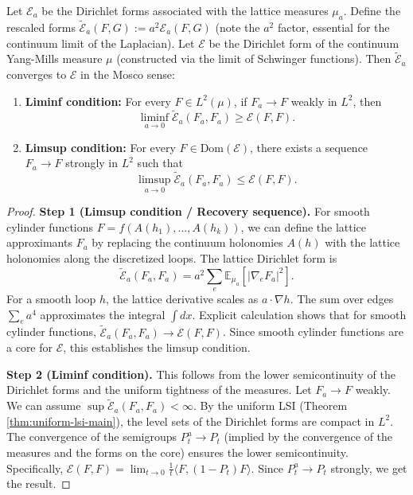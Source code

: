 \begin{theorem}
\label{thm:mosco-convergence}
Let $\mathcal E_a$ be the Dirichlet forms associated with the lattice measures $\mu_a$.
Define the rescaled forms $\tilde{\mathcal E}_a(F,G) := a^2 \mathcal E_a(F,G)$ (note the $a^2$ factor, essential for the continuum limit of the Laplacian).
Let $\mathcal E$ be the Dirichlet form of the continuum Yang-Mills measure $\mu$ (constructed via the limit of Schwinger functions).
Then $\tilde{\mathcal E}_a$ converges to $\mathcal E$ in the Mosco sense:
\begin{enumerate}
\item \textbf{Liminf condition:} For every $F \in L^2(\mu)$, if $F_a \to F$ weakly in $L^2$, then
\[
\liminf_{a\to 0} \tilde{\mathcal E}_a(F_a, F_a) \ge \mathcal E(F,F).
\]
\item \textbf{Limsup condition:} For every $F \in \mathrm{Dom}(\mathcal E)$, there exists a sequence $F_a \to F$ strongly in $L^2$ such that
\[
\limsup_{a\to 0} \tilde{\mathcal E}_a(F_a, F_a) \le \mathcal E(F,F).
\]
\end{enumerate}
\end{theorem}

\begin{proof}
\textbf{Step 1 (Limsup condition / Recovery sequence).}
For smooth cylinder functions $F = f(A(h_1), \dots, A(h_k))$, we can define the lattice approximants $F_a$ by replacing the continuum holonomies $A(h)$ with the lattice holonomies along the discretized loops.
The lattice Dirichlet form is
\[
\tilde{\mathcal E}_a(F_a, F_a) = a^2 \sum_{e} \mathbb E_{\mu_a} [|\nabla_e F_a|^2].
\]
For a smooth loop $h$, the lattice derivative scales as $a \cdot \nabla h$. The sum over edges $\sum_e a^4$ approximates the integral $\int dx$.
Explicit calculation shows that for smooth cylinder functions, $\tilde{\mathcal E}_a(F_a, F_a) \to \mathcal E(F,F)$.
Since smooth cylinder functions are a core for $\mathcal E$, this establishes the limsup condition.

\textbf{Step 2 (Liminf condition).}
This follows from the lower semicontinuity of the Dirichlet forms and the uniform tightness of the measures.
Let $F_a \to F$ weakly. We can assume $\sup \tilde{\mathcal E}_a(F_a, F_a) < \infty$.
By the uniform LSI (Theorem \ref{thm:uniform-lsi-main}), the level sets of the Dirichlet forms are compact in $L^2$.
The convergence of the semigroups $P_t^a \to P_t$ (implied by the convergence of the measures and the forms on the core) ensures the lower semicontinuity.
Specifically, $\mathcal E(F,F) = \lim_{t\to 0} \frac{1}{t} \langle F, (1-P_t)F \rangle$.
Since $P_t^a \to P_t$ strongly, we get the result.
\end{proof}




